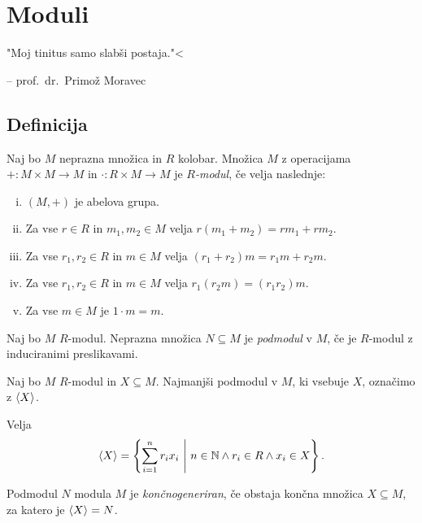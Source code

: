 \section{Moduli}

\epigraph{"Moj tinitus samo slabši postaja."<}{-- prof.~dr.~Primož
Moravec}

\subsection{Definicija}

\begin{definicija}
Naj bo $M$ neprazna množica in $R$ kolobar. Množica $M$ z
operacijama $+ \colon M \times M \to M$ in
$\cdot \colon R \times M \to M$ je \emph{$R$-modul},
če velja naslednje:

\begin{enumerate}[i)]
\item $(M, +)$ je abelova grupa.
\item Za vse $r \in R$ in $m_1, m_2 \in M$ velja
$r (m_1 + m_2) = r m_1 + r m_2$.
\item Za vse $r_1, r_2 \in R$ in $m \in M$ velja
$(r_1 + r_2) m = r_1 m + r_2 m$.
\item Za vse $r_1, r_2 \in R$ in $m \in M$ velja
$r_1 (r_2 m) = (r_1 r_2) m$.
\item Za vse $m \in M$ je $1 \cdot m = m$.
\end{enumerate}
\end{definicija}

\begin{definicija}
Naj bo $M$ $R$-modul. Neprazna množica $N \subseteq M$ je
\emph{podmodul} v $M$, če je $R$-modul z
induciranimi preslikavami.
\end{definicija}


\begin{definicija}
Naj bo $M$ $R$-modul in $X \subseteq M$. Najmanjši podmodul v $M$,
ki vsebuje $X$, označimo z $\left\langle X\right\rangle$.
\end{definicija}

\begin{trditev}
Velja
\[
\left\langle X\right\rangle = \left\{\sum_{i=1}^n r_i x_i~\middle\vert~n \in \mathbb{N} \land r_i \in R \land x_i \in X\right\}.
\]
\end{trditev}

\obvs

\begin{definicija}
Podmodul $N$ modula $M$ je
\emph{končnogeneriran}, če obstaja
končna množica $X \subseteq M$, za katero je $\left\langle X\right\rangle = N$.
\end{definicija}

